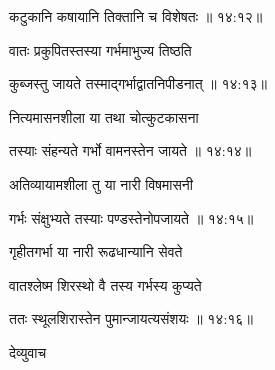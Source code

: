 {\devanagarifont कटुकानि कषायानि तिक्तानि च विशेषतः {॥ १४:१२॥} \veg\dontdisplaylinenum }%
 
{\devanagarifont वातः प्रकुपितस्तस्या गर्भमाभुज्य तिष्ठति \thinspace{\dandab} \dontdisplaylinenum }%


{\devanagarifont कुब्जस्तु जायते तस्माद्गर्भाद्वातनिपीडनात् {॥ १४:१३॥} \veg\dontdisplaylinenum }%
 
{\devanagarifont नित्यमासनशीला या तथा चोत्कुटकासना \thinspace{\dandab} \dontdisplaylinenum }%


{\devanagarifont तस्याः संहन्यते गर्भो वामनस्तेन जायते {॥ १४:१४॥} \veg\dontdisplaylinenum }%

{\devanagarifont अतिव्यायामशीला तु या नारी विषमासनी \thinspace{\dandab} \dontdisplaylinenum }%


{\devanagarifont गर्भः संक्षुभ्यते तस्याः पण्डस्तेनोपजायते {॥ १४:१५॥} \veg\dontdisplaylinenum }%

{\devanagarifont गृहीतगर्भा या नारी रूढधान्यानि सेवते \thinspace{\dandab} \dontdisplaylinenum }%

{\devanagarifont वातश्लेष्म शिरस्थो वै तस्य गर्भस्य कुप्यते  \danda\dontdisplaylinenum }%


{\devanagarifont ततः स्थूलशिरास्तेन पुमान्जायत्यसंशयः {॥ १४:१६॥} \veg\dontdisplaylinenum }%
 
{\devanagarifont देव्युवाच {\dandab}\dontdisplaylinenum  }%
 
